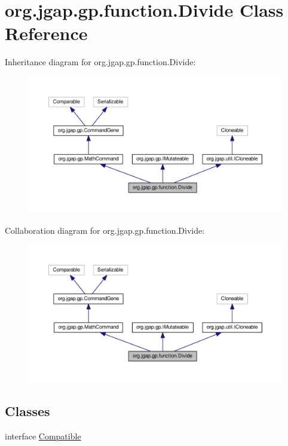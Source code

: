 \hypertarget{classorg_1_1jgap_1_1gp_1_1function_1_1_divide}{\section{org.\-jgap.\-gp.\-function.\-Divide Class Reference}
\label{classorg_1_1jgap_1_1gp_1_1function_1_1_divide}
}


Inheritance diagram for org.\-jgap.\-gp.\-function.\-Divide\-:
\nopagebreak
\begin{figure}[H]
\begin{center}
\leavevmode
\includegraphics[width=350pt]{classorg_1_1jgap_1_1gp_1_1function_1_1_divide__inherit__graph}
\end{center}
\end{figure}


Collaboration diagram for org.\-jgap.\-gp.\-function.\-Divide\-:
\nopagebreak
\begin{figure}[H]
\begin{center}
\leavevmode
\includegraphics[width=350pt]{classorg_1_1jgap_1_1gp_1_1function_1_1_divide__coll__graph}
\end{center}
\end{figure}
\subsection*{Classes}
\begin{DoxyCompactItemize}
\item 
interface \hyperlink{interfaceorg_1_1jgap_1_1gp_1_1function_1_1_divide_1_1_compatible}{Compatible}
\end{DoxyCompactItemize}
